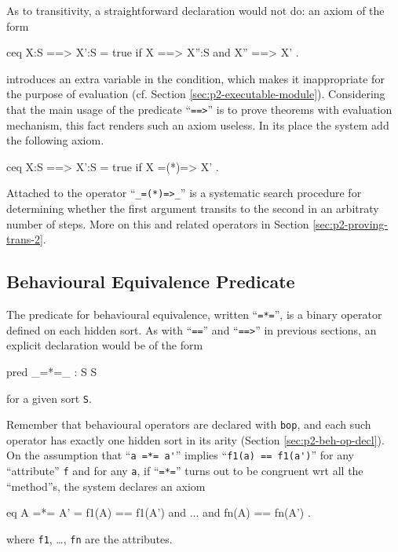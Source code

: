 \documentclass[a4paper]{memoir}
\begin{document}
As to transitivity, a straightforward declaration would not do:
an axiom of the form
\begin{vvtm}
\begin{ccode}
  ceq X:S ==> X':S = true if X ==> X'':S and X'' ==> X' .
\end{ccode}
\end{vvtm}
introduces an extra variable in the condition, which makes it
inappropriate for the purpose of evaluation (cf. Section
\ref{sec:p2-executable-module}). Considering that the main usage of
the predicate ``\verb|==>|'' is to prove theorems with evaluation mechanism,
this fact renders such an axiom useless. In its place the system add
the following axiom.
\begin{vvtm}
\begin{ccode}
  ceq X:S ==> X':S = true if X =(*)=> X' .
\end{ccode}
\end{vvtm}
Attached to the operator ``\verb|_=(*)=>_|'' is a systematic search
procedure for determining whether the first argument transits to
the second in an arbitraty number of steps. More on this and related
operators in Section \ref{sec:p2-proving-trans-2}.

\subsection{Behavioural Equivalence Predicate}\label{sec:p2-beh-equiv-pred}

The predicate for behavioural equivalence, written ``\verb|=*=|'',
\index{\texttt{=*=}} is a binary
operator defined on each hidden sort. As with ``\verb|==|'' and
``\verb|==>|'' in previous sections, an explicit declaration would be of the
form
\begin{vvtm}
\begin{ccode}
   pred _=*=_ : S S
\end{ccode}
\end{vvtm}
for a given sort \verb|S|.

Remember that behavioural operators are declared with \verb|bop|, and each
such operator has exactly one hidden sort in its arity
(Section \ref{sec:p2-beh-op-decl}).
On the assumption that ``\verb|a =*= a'|'' implies
``\verb|f1(a) == f1(a')|'' for any ``attribute'' \verb|f| and for
any \verb|a|, if ``\verb|=*=|'' turns out to be congruent wrt all the
``method''s, the system declares an axiom
\begin{vvtm}
\begin{ccode}
  eq A =*= A' = f1(A) == f1(A') and ... and fn(A) == fn(A') .
\end{ccode}
\end{vvtm}
where \verb|f1|, \ldots, \verb|fn| are the attributes.
\end{document}
